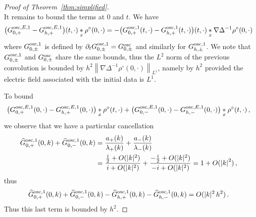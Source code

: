 \documentclass[a4paper,12pt]{amsart} %
\theoremstyle{plain}
\theoremstyle{definition}
\newcommand		{\lt}			{\left}				%
\newcommand		{\rt}			{\right}			%
\renewcommand	{\(}			{\lt(}
\renewcommand	{\)}			{\rt)}
\newcommand		{\n}[1]			{\lt\lvert{#1}\rt\rvert}	%
\newcommand		{\nrm}[1]		{\lt\lVert{#1}\rt\rVert}		%
\newcommand		{\Nrm}[2]		{\nrm{#1}_{#2}}
\newcommand		{\Gosc}			{G^{\textnormal{osc}}}
\newcommand		{\hatG}			{\widehat{G}}
\begin{document}
\begin{proof}[Proof of Theorem~\ref{thm:simplified}]
\begin{equation*}
		\end{equation*}
		It remains to bound the terms at $0$ and $t$. We have
		\begin{equation*}
			\bigl(G^{\textnormal{osc},E,1}_{0,+} - G^{\textnormal{osc},E,1}_{h,+}\bigr)(t,\cdot) \underset{x}{*} \rho^\circ(0,\cdot)
			= - \bigl(G^{\textnormal{osc},1}_{0,+}(t,\cdot) - G^{\textnormal{osc},1}_{h,+}(t,\cdot)\bigr)(t,\cdot) \underset{x}{*} \nabla \Delta^{-1} \rho^\circ(0,\cdot)
		\end{equation*}
		where $G^{\textnormal{osc},1}_{0,\pm}$ is defined by $\partial_t G^{\textnormal{osc},1}_{0,\pm} = \Gosc_{0,\pm}$ and similarly for $G^{\textnormal{osc},1}_{h,\pm}$. We note that $G^{\textnormal{osc},1}_{0,\pm}$ and $\Gosc_{0,\pm}$ share the same bounds, thus the $L^2$ norm of the previous convolution is bounded by $h^2 \Nrm{\nabla \Delta^{-1} \rho^\circ(0,\cdot)}{L^1}$, namely by $h^2$ provided the electric field associated with the initial data is $L^1$.
		
		To bound
		\begin{equation*}
			\bigl( G^{\textnormal{osc},E,1}_{0,+}(0,\cdot) - G^{\textnormal{osc},E,1}_{h,+}(0,\cdot) \bigr) \underset{x}{*} \rho^\circ(t,\cdot)
			+ \bigl( G^{\textnormal{osc},E,1}_{0,-}(0,\cdot) - G^{\textnormal{osc},E,1}_{h,-}(0,\cdot) \bigr) \underset{x}{*} \rho^\circ(t,\cdot) \, , 
		\end{equation*}
		we observe that we have a particular cancellation
		\begin{align*}
			\hatG^{\textnormal{osc},1}_{0,+}(0,k) + \hatG^{\textnormal{osc},1}_{0,-}(0,k)
			&= \frac{a_+(k)}{\lambda_+(k)} + \frac{a_-(k)}{\lambda_-(k)}
			\\
			&= \frac{{i\over 2}+O(|k|^2)}{i+O(|k|^2)} + \frac{-{i\over 2}+O(|k|^2)}{-i+O(|k|^2)} = 1+O(\n{k}^2) \, ,
		\end{align*}
		thus
		\begin{equation*}
			\widehat G^{\textnormal{osc},1}_{0,+}(0,k) + \widehat G^{\textnormal{osc},1}_{0,-}(0,k) - \widehat G^{\textnormal{osc},1}_{h,+}(0,k) - \widehat G^{\textnormal{osc},1}_{h,-}(0,k) = O(|k|^2 \, h^2) \, .
		\end{equation*}
		Thus this last term is bounded by $h^2$.


\end{proof}
\end{document}

